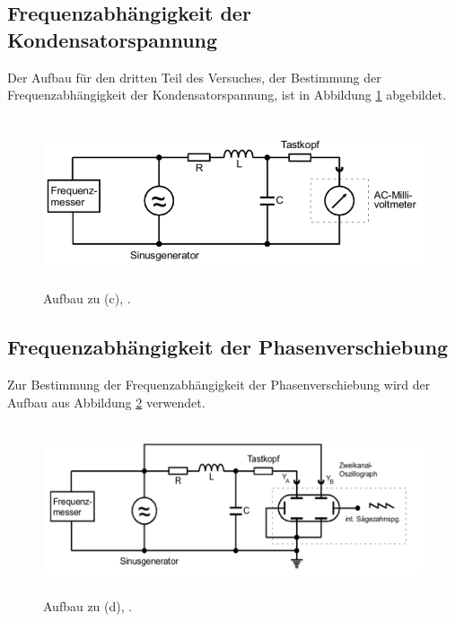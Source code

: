 \subsection{Frequenzabhängigkeit der Kondensatorspannung}

Der Aufbau für den dritten Teil des Versuches, der Bestimmung der Frequenzabhängigkeit der Kondensatorspannung, ist in Abbildung \ref{fig:c} abgebildet.
\begin{figure}[H]
  \centering
  \includegraphics[height=5cm]{Aufbau/Grafiken/c.pdf}
  \caption{Aufbau zu (c), \cite{1}.}
  \label{fig:c}
\end{figure}

\subsection{Frequenzabhängigkeit der Phasenverschiebung}

Zur Bestimmung der Frequenzabhängigkeit der Phasenverschiebung wird der Aufbau aus Abbildung \ref{fig:d} verwendet.
\begin{figure}[H]
  \centering
  \includegraphics[height=5cm]{Aufbau/Grafiken/d.pdf}
  \caption{Aufbau zu (d), \cite{1}.}
  \label{fig:d}
\end{figure}